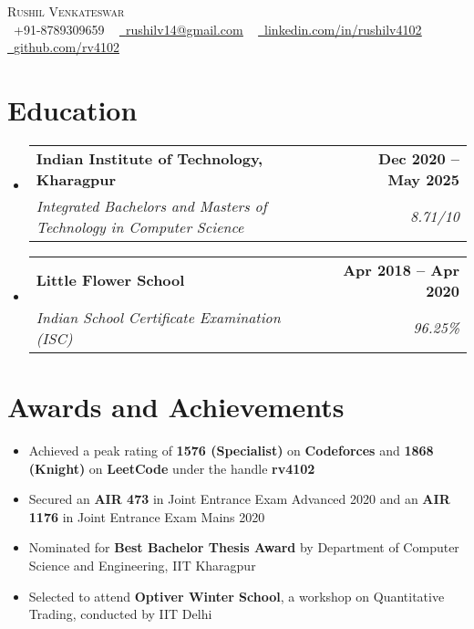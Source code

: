 \documentclass[letterpaper]{article}
\makeatletter
\newcommand{\resumeItem}[1]{
  \item\small{
    {#1 \vspace{-2pt}}
  }
}
\newcommand{\resumeEducation}[4]{
  \vspace{-2pt}\item
    \begin{tabular*}{1.0\textwidth}[t]{l@{\extracolsep{\fill}}r}
      \textbf{#1} & \textbf{\small #2} \\
      \textit{\small#3} & \textit{\small #4} \\
    \end{tabular*}\vspace{-7pt}
}
\newcommand{\resumeSubHeadingListStart}{\begin{itemize}[leftmargin=0.0in, label={}]}
\newcommand{\resumeSubHeadingListEnd}{\end{itemize}}
\newcommand{\resumeItemListStart}{\begin{itemize}[leftmargin=0.2in]}
\newcommand{\resumeItemListEnd}{\end{itemize}\vspace{-5pt}}
\makeatother
\begin{document}

\begin{center}
    {\Huge \scshape Rushil Venkateswar} \\ \vspace{1.5pt}
    \small \raisebox{-0.1\height}\faPhone\ +91-8789309659 ~ \href{mailto:x=rushilv14@gmail.com}{\raisebox{-0.2\height}\faEnvelope\  \underline{rushilv14@gmail.com}} ~ 
    \href{https://www.linkedin.com/in/rushilv4102/}{\raisebox{-0.2\height}\faLinkedin\ \underline{linkedin.com/in/rushilv4102}}  ~
    \href{https://github.com/rv4102}{\raisebox{-0.2\height}\faGithub\ \underline{github.com/rv4102}}
\end{center}
\vspace{-18pt}


\section{Education}
  \resumeSubHeadingListStart
    \resumeEducation
      {Indian Institute of Technology, Kharagpur}
      {Dec 2020 -- May 2025}
      {Integrated Bachelors and Masters of Technology in Computer Science}{8.71/10}
    
    \resumeEducation
      {Little Flower School}
      {Apr 2018 -- Apr 2020}
      {Indian School Certificate Examination (ISC)}
      {96.25\%}
  \resumeSubHeadingListEnd
\vspace{-10pt}

\section{Awards and Achievements}
    \resumeItemListStart
    \itemsep0em 
        \resumeItem{Achieved a peak rating of \textbf{1576 (Specialist)} on \textbf{Codeforces} and \textbf{1868 (Knight)} on \textbf{LeetCode} under the handle \textbf{rv4102}}
        \resumeItem{Secured an \textbf{AIR 473} in Joint Entrance Exam Advanced 2020 and an \textbf{AIR 1176} in Joint Entrance Exam Mains 2020}
        \resumeItem{Nominated for \textbf{Best Bachelor Thesis Award} by Department of Computer Science and Engineering, IIT Kharagpur}
        \resumeItem{Selected to attend \textbf{Optiver Winter School}, a workshop on Quantitative Trading, conducted by IIT Delhi}
    \resumeItemListEnd
\vspace{-10pt}
  
\end{document}
